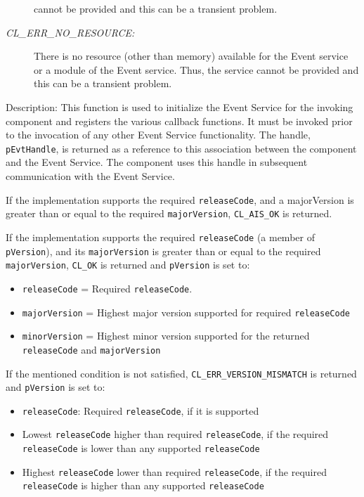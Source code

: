 \begin{flushleft}
\begin{Desc}
\begin{description}
cannot be provided and this can be a transient problem.
\item[{\em CL\_\-ERR\_\-NO\_\-RESOURCE:}]There is no resource (other than memory) available for the Event service or a module of the Event service. Thus,
the service cannot be provided and this can be a transient problem.
\end{description}
\end{Desc}
\begin{Desc}
\item[Description:]
This function is used to initialize the Event Service for the invoking component and registers the various callback functions. It must be invoked prior
to the invocation of any other Event Service functionality. The handle, {\tt{pEvtHandle}}, is returned as a reference to this association between the 
component and the Event Service. The component uses this handle in subsequent communication with the Event Service. 
\par 
If the implementation supports the required {\tt{releaseCode}}, and a majorVersion 
is greater than or equal to the required {\tt{majorVersion}}, {\tt{CL\_\-AIS\_\-OK}} is returned. 
\par
If the implementation supports the required {\tt{releaseCode}} (a member of {\tt{pVersion}}), and its {\tt{majorVersion}} is greater than or equal to
the required {\tt{majorVersion}}, 
{\tt{CL\_\-OK}} is returned and {\tt{pVersion}} is set to:
\begin{itemize}
\item
{\tt{releaseCode}} = Required {\tt{releaseCode}}.
\item
{\tt{majorVersion}} = Highest major version supported for required {\tt{releaseCode}}
\item
{\tt{minorVersion}} = Highest minor version supported for the returned {\tt{releaseCode}} and {\tt{majorVersion}}
\end{itemize}
If the mentioned condition is not satisfied, {\tt{CL\_\-ERR\_\-VERSION\_\-MISMATCH}} is returned and {\tt{pVersion}} is set to:
\begin{itemize}
\item
{\tt{releaseCode}}: Required {\tt{releaseCode}}, if it is supported
\item
Lowest {\tt{releaseCode}} higher than required {\tt{releaseCode}}, if the required {\tt{releaseCode}} is lower than any supported {\tt{releaseCode}}
\item
Highest {\tt{releaseCode}} lower than required {\tt{releaseCode}}, if the required {\tt{releaseCode}} is higher than any supported {\tt{releaseCode}}

\end{itemize}
\end{Desc}
\end{flushleft}
